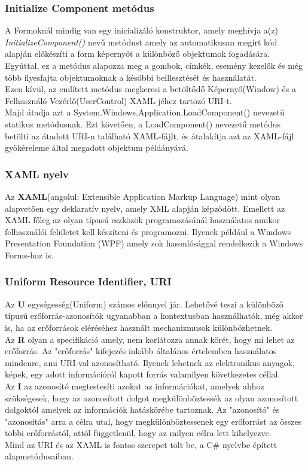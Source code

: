 \documentclass[tocnopagenum]{thesis-ekf}
\theoremstyle{definition}
\theoremstyle{remark}
\begin{document}
	\subsubsection{Initialize Component metódus}
	A Formoknál mindig van egy inicializáló konstruktor, amely meghívja a(z) \textit{InitializeComponent()} nevű metódust amely az automatikusan megírt kód alapján előkészíti a form képernyőt a különböző objektumok fogadására. Egyúttal, ez a metódus alapozza meg a gombok, címkék, esemény kezelők és még több ilyesfajta objektumoknak a későbbi beillesztését és használatát.
\\
Ezen kívül, az említett metódus megkeresi a betöltődő Képernyő(Window) és a Felhasználó Vezérlő(UserControl) XAML-jéhez tartozó URI-t.
\\
Majd átadja azt a System.Windows.Application.LoadComponent() nevezetű statikus metódusnak.
Ezt követően, a LoadComponent() nevezetű metódus betölti az átadott URI-n található XAML-fájlt, és átalakítja azt az XAML-fájl gyökéreleme által megadott objektum példányává.
\\
\subsubsection{XAML nyelv}
Az \textbf{XAML}(angolul: Extensible Application Markup Language) mint olyan alapvetően egy deklaratív nyelv, amely XML alapján képződött.
Emellett az XAML főleg az olyan típusú eszközök programozásánál használatos amikor felhasználói felületet kell készíteni és programozni. Ilyenek például a Windows Presentation Foundation (WPF) amely sok hasonlósággal rendelkezik a Windows Forms-hoz is.
\\
\subsubsection{Uniform Resource Identifier, URI}
Az \textbf{U} egységesség(Uniform) számos előnnyel jár. Lehetővé teszi a különböző típusú
erőforrás-azonosítók ugyanabban a kontextusban használhatók, még akkor is, ha az erőforrások eléréséhez használt mechanizmusok különbözhetnek.
\\
Az \textbf{R} olyan a specifikáció amely, nem korlátozza annak körét, hogy mi lehet az erőforrás. Az "erőforrás" kifejezés inkább általános értelemben használatos mindenre, ami URI-val azonosítható. Ilyenek lehetnek az elektronikus anyagok, képek, egy adott információról kapott forrás valamilyen következetes céllal.
\\
Az \textbf{I} az azonosító megtestesíti azokat az információkat, amelyek ahhoz szükségesek, hogy az azonosított dolgot megkülönböztessék az olyan azonosított dolgoktól amelyek az információk hatáskörébe tartoznak.\cite{uri}
Az "azonosító" és "azonosítás" arra a célra utal, hogy megkülönböztessenek egy erőforrást az összes többi erőforrástól, attól függetlenül, hogy az milyen célra lett kihelyezve.  
\\
Mind az URI és az XAML is fontos szerepet tölt be, a C\# nyelvbe épített alapmetódusaiban.
\end{document}

